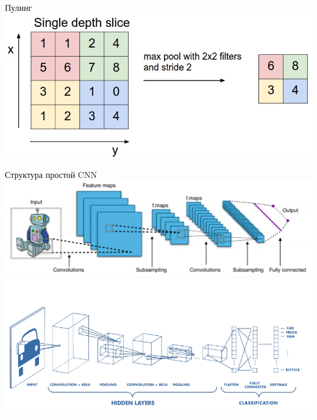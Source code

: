 \documentclass[aspectratio=169]{beamer}
\begin{document}
\begin{frame}{Пулинг}
    \centering
    \includegraphics[width=\linewidth]{graphs/maxpool.jpeg}
\end{frame}

\begin{frame}{Структура простой CNN}
    \centering
    \includegraphics[width=0.63\linewidth]{graphs/typical_cnn.png}
    \includegraphics[width=0.63\linewidth]{graphs/typical_cnn2.png}
\end{frame}
\end{document}
